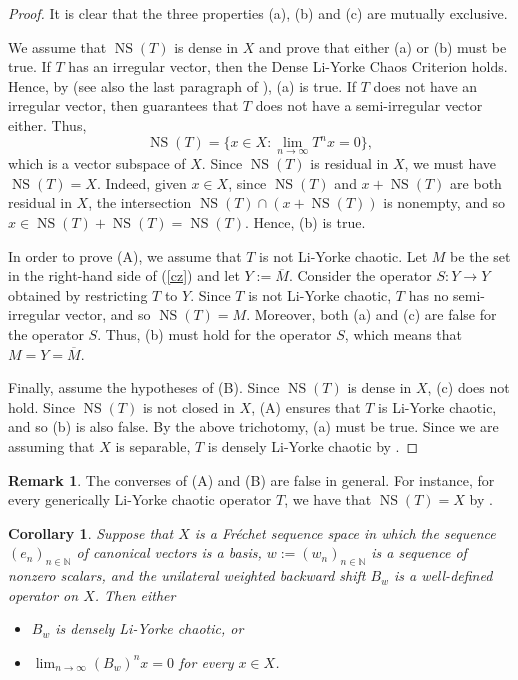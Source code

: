 \documentclass[12pt]{amsart}
\theoremstyle{theorem}
\newtheorem{corollary}[theorem]{Corollary}
\theoremstyle{definition}
\newtheorem{remark}[theorem]{Remark}
\theoremstyle{remark} \theoremstyle{question} \theoremstyle{example}
\newcommand{\N}{\mathbb{N}}
\newcommand{\NS}{\operatorname{NS}}
\newcommand{\ov} {\overline}
\begin{document}
\begin{proof}
It is clear that the three properties (a), (b) and (c) are mutually exclusive. 

We assume that $\NS(T)$ is dense in $X$ and prove that either (a) or (b) must be true.
If $T$ has an irregular vector, then the Dense Li-Yorke Chaos Criterion \cite[Definition~16]{BerBonMulPer15} holds.
Hence, by \cite[Theorem~17]{BerBonMulPer15} (see also the last paragraph of \cite[Section~6]{BerBonMulPer15}), (a) is true.
If $T$ does not have an irregular vector, then \cite[Theorem~8]{BerBonMulPer15} guarantees that $T$ does not have a semi-irregular 
vector either. Thus,
\begin{equation}\label{cz}
\NS(T) = \Big\{x \in X : \lim_{n \to \infty} T^n x = 0\Big\},
\end{equation}
which is a vector subspace of $X$. Since $\NS(T)$ is residual in $X$, we must have $\NS(T) = X$. 
Indeed, given $x \in X$, since $\NS(T)$ and $x + \NS(T)$ are both residual in $X$, the intersection $\NS(T) \cap (x + \NS(T))$
is nonempty, and so $x \in \NS(T) + \NS(T) = \NS(T)$. Hence, (b) is true.

In order to prove (A), we assume that $T$ is not Li-Yorke chaotic. 
Let $M$ be the set in the right-hand side of (\ref{cz}) and let $Y\!:= \ov{M}$.
Consider the operator $S : Y \to Y$ obtained by restricting $T$ to $Y$. 
Since $T$ is not Li-Yorke chaotic, $T$ has no semi-irregular vector, and so $\NS(T) = M$. 
Moreover, both (a) and (c) are false for the operator $S$. 
Thus, (b) must hold for the operator $S$, which means that $M = Y = \ov{M}$.

Finally, assume the hypotheses of (B). 
Since $\NS(T)$ is dense in $X$, (c) does not hold.
Since $\NS(T)$ is not closed in $X$, (A) ensures that $T$ is Li-Yorke chaotic, and so (b) is also false. 
By the above trichotomy, (a) must be true.
Since we are assuming that $X$ is separable, $T$ is densely Li-Yorke chaotic by \cite[Theorem~10]{BerBonMulPer15}.
\end{proof}

\begin{remark}
The converses of (A) and (B) are false in general. For instance, for every generically Li-Yorke chaotic operator $T$, 
we have that $\NS(T) = X$ by \cite[Theorem~34]{BerBonMulPer15}.
\end{remark}

\begin{corollary}\label{UWBS}
Suppose that $X$ is a Fr\'echet sequence space in which the sequence $(e_n)_{n \in \N}$ of canonical vectors is a basis,
$w\!:= (w_n)_{n \in \N}$ is a sequence of nonzero scalars, and the unilateral weighted backward shift $B_w$ is a well-defined 
operator on $X$. Then either
\begin{itemize}
\item [\rm (a)] $B_w$ is densely Li-Yorke chaotic, or
\item [\rm (b)] $\displaystyle \lim_{n \to \infty} (B_w)^n x = 0$ for every $x \in X$.
\end{itemize}
\end{corollary}
\end{document}
